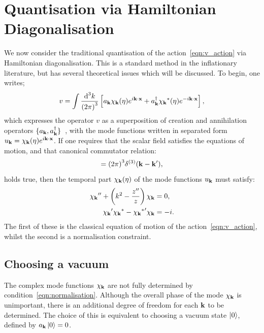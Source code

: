 \section{Quantisation via Hamiltonian Diagonalisation}                                
\label{sec:mukhanov}
We now consider the traditional quantisation of the action~\eqref{eqn:v_action} via Hamiltonian diagonalisation. This is a standard method in the inflationary literature, but has several theoretical issues which will be discussed. To begin, one writes;
\begin{equation}
  v = \int \frac{\d[3]{k}}{{(2\pi)}^3} \left[ a_\vk \chi_\vk(\eta)e^{i\vk\cdot\vx} + a_{\vk}^{\dagger} \str{\chi_\vk}(\eta)e^{-i\vk\cdot\vx} \right], 
  \label{eqn:v_quant}
\end{equation}
which expresses the operator $v$ as a superposition of creation and annihilation operators $\{a_{\mathbf{k}},a_{\mathbf{k}}^\dagger\}$~\cite{Mukhanov+2007}, with the mode functions written in separated form ${u_{\mathbf{k}} = \chi_{\mathbf{k}}(\eta) e^{i\mathbf{k}\cdot\mathbf{x}}}$. If one requires that the scalar field satisfies the equations of motion, and that canonical commutator relation:
\begin{equation}
  [ a_\vk^{\phantom\dagger} a_{\prm{\vk}}^{\dagger} ] = {(2\pi)}^3\delta^{(3)}(\vk-\prm{\vk}),
  \label{eqn:commutator}
\end{equation}
holds true, then the temporal part $\chi_{\mathbf{k}}(\eta)$ of the mode functions $u_{\mathbf{k}}$ must satisfy:
\begin{align}
  \dprm{\chi_\vk} + \left( k^2 - \frac{\dprm{z}}{z} \right)\chi_\vk &= 0,
  \label{eqn:mode_mukhanov}
  \\
  \prm{\chi_\vk} \str{\chi_\vk} - \prm{\str{\chi_\vk}} \chi_\vk &= -i.
  \label{eqn:normalisation}
\end{align}
The first of these is the classical equation of motion of the action~\eqref{eqn:v_action}, whilst the second is a normalisation constraint.

\subsection{Choosing a vacuum}
\label{sec:hamiltonian_diagonalisation}
The complex mode functions $\chi_{\mathbf{k}}$ are not fully determined by condition~\eqref{eqn:normalisation}. Although the overall phase of the mode $\chi_{\mathbf{k}}$ is unimportant, there is an additional degree of freedom for each $\mathbf{k}$ to be determined. The choice of this is equivalent to choosing a vacuum state $\left|0\right\rangle$, defined by $a_{\mathbf{k}}\left|0\right\rangle=0$.

